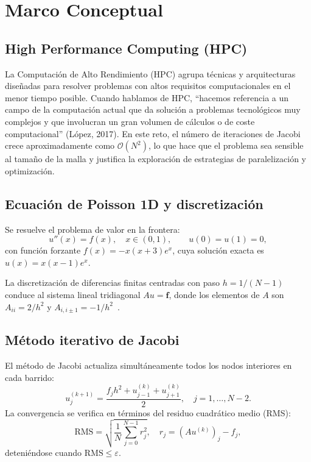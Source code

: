 \documentclass{article}
\begin{document}
\section{Marco Conceptual}

\subsection{High Performance Computing (HPC)}

La Computación de Alto Rendimiento (HPC) agrupa técnicas y arquitecturas
diseñadas para resolver problemas con altos requisitos computacionales en el
menor tiempo posible.  Cuando hablamos de HPC, ``hacemos referencia a un campo
de la computación actual que da solución a problemas tecnológicos muy complejos
y que involucran un gran volumen de cálculos o de coste computacional''
(López, 2017).  En este reto, el número de iteraciones de Jacobi crece
aproximadamente como $\mathcal{O}(N^2)$, lo que hace que el problema sea
sensible al tamaño de la malla y justifica la exploración de estrategias de
paralelización y optimización.

\subsection{Ecuación de Poisson 1D y discretización}

Se resuelve el problema de valor en la frontera:
\[
  u''(x) = f(x), \quad x \in (0,1), \qquad u(0) = u(1) = 0,
\]
con función forzante $f(x) = -x(x+3)e^x$, cuya solución exacta es
$u(x) = x(x-1)e^x$.

La discretización de diferencias finitas centradas con paso $h = 1/(N-1)$
conduce al sistema lineal tridiagonal $Au = \mathbf{f}$, donde los elementos de
$A$ son $A_{ii} = 2/h^2$ y $A_{i,i\pm 1} = -1/h^2$~\cite{burkardt}.

\subsection{Método iterativo de Jacobi}

El método de Jacobi actualiza simultáneamente todos los nodos interiores en cada
barrido:
\[
  u_j^{(k+1)} = \frac{f_j h^2 + u_{j-1}^{(k)} + u_{j+1}^{(k)}}{2},
  \quad j = 1, \ldots, N-2.
\]
La convergencia se verifica en términos del residuo cuadrático medio (RMS):
\[
  \text{RMS} = \sqrt{\frac{1}{N}\sum_{j=0}^{N-1} r_j^2},
\quad
  r_j = (Au^{(k)})_j - f_j,
\]
deteniéndose cuando $\text{RMS} \leq \varepsilon$.
\end{document}
